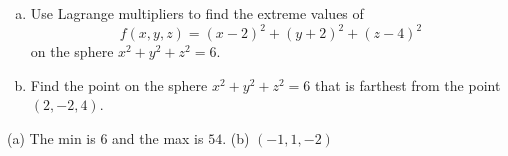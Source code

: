 \begin{question}[M200 2012D] %
\begin{enumerate}[(a)]
\item
Use Lagrange multipliers to find the extreme values of
\begin{equation*}
f (x, y, z) = (x - 2)^2 + (y + 2)^2 + (z - 4)^2
\end{equation*}
on the sphere $x^2 + y^2 + z^2 = 6$.
\item
Find the point on the sphere $x^2 + y^2 + z^2 = 6$ that is farthest from the point 
$(2, -2, 4)$.
\end{enumerate}
\end{question}

%

\begin{answer}
(a) The min is $6$ and the max is $54$. \qquad
(b) $(-1,1,-2)$
\end{answer}

